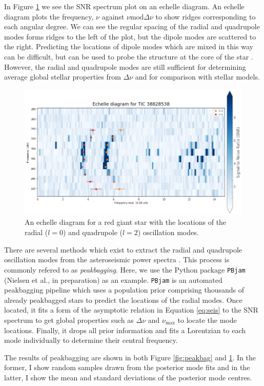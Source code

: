In Figure \ref{fig:echelle} we see the SNR spectrum plot on an echelle diagram. An echelle diagram plots the frequency, $\nu$ against $\nu \mathrm{mod} \Delta\nu$ to show ridges corresponding to each angular degree. We can see the regular spacing of the radial and quadrupole modes forms ridges to the left of the plot, but the dipole modes are scattered to the right. Predicting the locations of dipole modes which are mixed in this way can be difficult, but can be used to probe the structure at the core of the star \citep[see e.g.][]{Mosser.Gehan.ea2018}. However, the radial and quadrupole modes are still sufficient for determining average global stellar properties from $\Delta\nu$ and for comparison with stellar models.

\begin{figure}
    \centering
    \includegraphics[width=0.8\linewidth]{introduction/images/echelle.png}
    \caption{An echelle diagram for a red giant star with the locations of the radial ($l=0$) and quadrupole ($l=2$) oscillation modes.}
    \label{fig:echelle}
\end{figure}

There are several methods which exist to extract the radial and quadrupole oscillation modes from the asteroseismic power spectra \citep[see e.g.][]{Mosser.Belkacem.ea2011, Appourchaux.Chaplin.ea2012, Davies.Aguirre.ea2016}. This process is commonly refered to as \emph{peakbagging}. Here, we use the Python package \texttt{PBjam} (Nielsen et al., in preparation) as an example. \texttt{PBjam} is an automated peakbagging pipeline which uses a population prior comprising thousands of already peakbagged stars to predict the locations of the radial modes. Once located, it fits a form of the asymptotic relation in Equation \ref{eq:seis} to the SNR spectrum to get global properties such as $\Delta\nu$ and $\nu_\mathrm{max}$ to locate the mode locations. Finally, it drops all prior information and fits a Lorentzian to each mode individually to determine their central frequency.

The results of peakbagging are shown in both Figure \ref{fig:peakbag} and \ref{fig:echelle}. In the former, I show random samples drawn from the posterior mode fits and in the latter, I show the mean and standard deviations of the posterior mode centres. 
